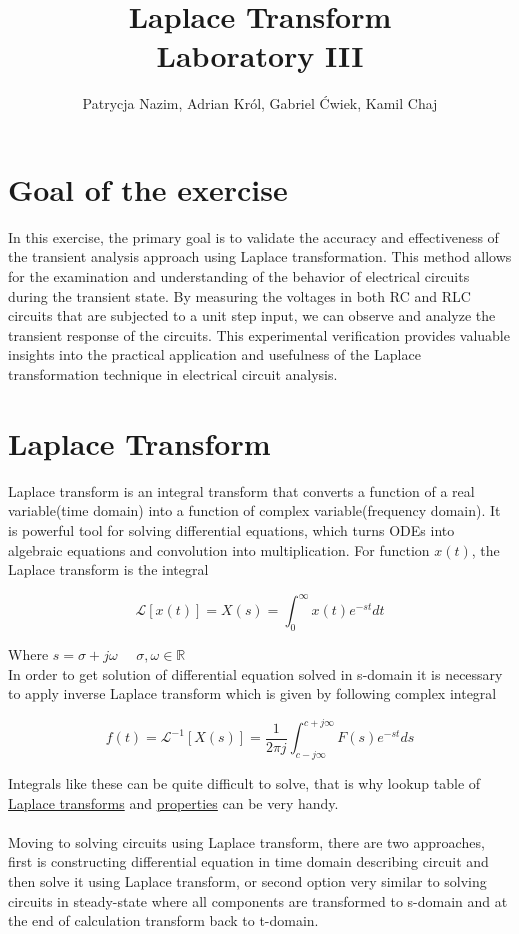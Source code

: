 \documentclass[notitlepage, a4paper, 11pt]{article}
\title{Laplace Transform\\
	\large Laboratory III}
\author{Patrycja Nazim, Adrian Król, Gabriel Ćwiek, Kamil Chaj}
\date{}
\begin{document}
	\maketitle
	\section{Goal of the exercise}
	
	In this exercise, the primary goal is to validate the accuracy and effectiveness of the transient analysis approach using Laplace transformation. This method allows for the examination and understanding of the behavior of electrical circuits during the transient state. By measuring the voltages in both RC and RLC circuits that are subjected to a unit step input, we can observe and analyze the transient response of the circuits. This experimental verification provides valuable insights into the practical application and usefulness of the Laplace transformation technique in electrical circuit analysis.
	
	\section{Laplace Transform}
	Laplace transform is an integral transform that converts a function of a real variable(time domain) into a function of complex variable(frequency domain). It is powerful tool for solving differential equations, which turns ODEs into algebraic equations and convolution into multiplication. For function $x(t)$, the Laplace transform is the integral
	
	\begin{equation}
		\mathcal{L}[x(t)] = X(s) = \int_{0}^{\infty}x(t)e^{-st}dt
	\end{equation}
	
	Where $s = \sigma+j\omega$ $\quad \sigma,\omega\in \mathbb{R}$
	\\
	In order to get solution of differential equation solved in s-domain it is necessary to apply inverse Laplace transform which is given by following complex integral
	
	\begin{equation}
		f(t) = \mathcal{L}^{-1}[X(s)] = \dfrac{1}{2\pi j}\int_{c-j\infty}^{c+j\infty}F(s)e^{-st}ds
	\end{equation}
	
	Integrals like these can be quite difficult to solve, that is why lookup table of \href{https://en.wikipedia.org/wiki/Laplace_transform#Table_of_selected_Laplace_transforms}{Laplace transforms} and \href{https://en.wikipedia.org/wiki/Laplace_transform#Properties_and_theorems}{properties} can be very handy.
	\\ \\
	Moving to solving circuits using Laplace transform, there are two approaches, first is constructing differential equation in time domain describing circuit and then solve it using Laplace transform, or second option very similar to solving circuits in steady-state where all components are transformed to s-domain and at the end of calculation transform back to t-domain.
	
\end{document}
